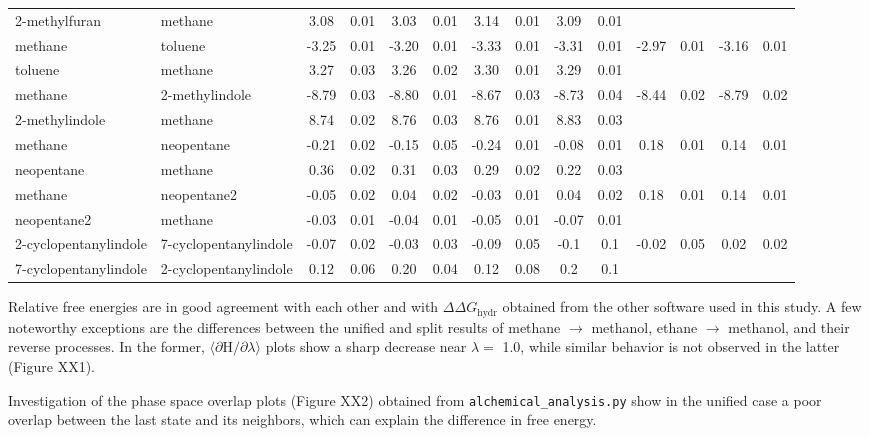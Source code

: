 \documentclass[journal=jctcce,manuscript=article]{achemso}
\newcommand{\progname}[1]{\texttt{#1}}
\begin{document}
\begin{table}
{\begin{tabular}{llcccccccccccc}
      2-methylfuran & methane & 3.08 & 0.01 & 3.03 & 0.01 & 3.14 & 0.01 & 3.09 
      & 0.01 &  &  &  &  \\
      methane & toluene & -3.25 & 0.01 & -3.20 & 0.01 & -3.33 & 0.01 & -3.31 & 
      0.01 & -2.97 & 0.01 & -3.16 & 0.01 \\
      toluene & methane & 3.27 & 0.03 & 3.26 & 0.02 & 3.30 & 0.01 & 3.29 & 0.01 
      &  &  &  &  \\
      methane & 2-methylindole & -8.79 & 0.03 & -8.80 & 0.01 & -8.67 & 0.03 & 
      -8.73 & 0.04 & -8.44 & 0.02 & -8.79 & 0.02 \\
      2-methylindole & methane & 8.74 & 0.02 & 8.76 & 0.03 & 8.76 & 0.01 & 8.83 
      & 0.03 &  &  &  &  \\
      methane & neopentane & -0.21 & 0.02 & -0.15 & 0.05 & -0.24 & 0.01 & -0.08 
      & 0.01 & 0.18 & 0.01 & 0.14 & 0.01 \\
      neopentane & methane & 0.36 & 0.02 & 0.31 & 0.03 & 0.29 & 0.02 & 0.22 & 
      0.03 &  &  &  &  \\
      methane & neopentane2 & -0.05 & 0.02 & 0.04 & 0.02 & -0.03 & 0.01 & 0.04 
      & 0.02 & 0.18 & 0.01 & 0.14 & 0.01 \\
      neopentane2 & methane & -0.03 & 0.01 & -0.04 & 0.01 & -0.05 & 0.01 & 
      -0.07 & 0.01 &  &  &  &  \\
      2-cyclopentanylindole & 7-cyclopentanylindole & -0.07 & 0.02 & -0.03 & 
      0.03 & -0.09 & 0.05 & -0.1 & 0.1 & -0.02 & 0.05 & 0.02 & 0.02 \\
      7-cyclopentanylindole & 2-cyclopentanylindole & 0.12 & 0.06 & 0.20 & 0.04 
      & 0.12 & 0.08 & 0.2 & 0.1 &  &  &  &  \\ \bottomrule
    \end{tabular}
  }
\end{table}
Relative free energies are in good agreement with each other and with 
$\Delta \Delta G_{\mathrm{hydr}}$ obtained from the other software used in this study. 
A few noteworthy exceptions are the differences between the unified and split results of 
methane $\rightarrow$ methanol, ethane $\rightarrow$ methanol, and their reverse processes.
In the former, $\langle \partial \mathrm{H}/\partial \lambda \rangle$ plots show a sharp decrease 
near $\lambda = $ 1.0, while similar behavior is not observed in the latter 
(Figure XX1). 

Investigation of the phase space overlap plots (Figure XX2) obtained from \progname{alchemical\_analysis.py} 
show in the unified case a poor overlap between the last state and its neighbors, 
which can explain the difference in free energy. 
\end{document}
